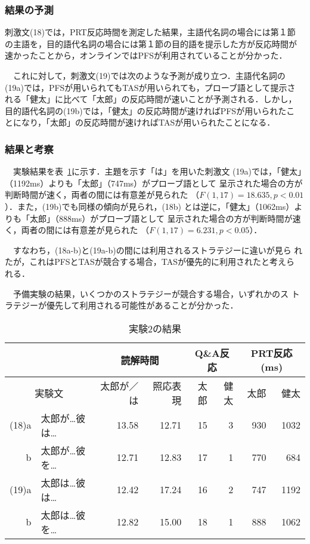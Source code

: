 \subsubsection{結果の予測}
刺激文(18)では，PRT反応時間を測定した結果，主語代名詞の場合には第１節
の主語を，目的語代名詞の場合には第１節の目的語を提示した方が反応時間が
速かったことから，オンラインではPFSが利用されていることが分かった．

　これに対して，刺激文(19)では次のような予測が成り立つ．主語代名詞の
(19a)では，PFSが用いられてもTASが用いられても，プローブ語として提示さ
れる「健太」に比べて「太郎」の反応時間が速いことが予測される．しかし，
目的語代名詞の(19b)では，「健太」の反応時間が速ければPFSが用いられたこ
とになり，「太郎」の反応時間が速ければTASが用いられたことになる．


\subsubsection{結果と考察}
　実験結果を表~\ref{table:exam2br}に示す．主題を示す「は」を用いた刺激文
(19a)では，「健太」（1192ms）よりも「太郎」（747ms）がプローブ語として
呈示された場合の方が判断時間が速く，両者の間には有意差が見られた
（$F(1,17)=18.635,p<0.01$）．また，(19b)でも同様の傾向が見られ，(18b)
とは逆に，「健太」（1062ms）よりも「太郎」（888ms）がプローブ語として
呈示された場合の方が判断時間が速く，両者の間には有意差が見られた
（$F(1,17)=6.231,p<0.05$）．

　すなわち，(18a-b)と(19a-b)の間には利用されるストラテジーに違いが見ら
れたが，これはPFSとTASが競合する場合，TASが優先的に利用されたと考えら
れる．

　予備実験の結果，いくつかのストラテジーが競合する場合，いずれかのス
トラテジーが優先して利用される可能性があることが分かった．

\begin{table}
\begin{center}
\caption{実験2の結果}
\label{table:exam2br}
\begin{tabular}{|rl|r|r|r|r|r|r|} \hline
 \multicolumn{2}{|c|}{}&
 \multicolumn{2}{c|}{読解時間} &
 \multicolumn{2}{c|}{Q\&A反応} &
 \multicolumn{2}{c|}{PRT反応(ms)} \\ \hline
 \multicolumn{2}{|c|}{実験文} & 
  太郎が／は & 照応表現 & 太郎 & 健太 & 太郎 & 健太 \\ \hline
 (18)a&	太郎が\ldots 彼は\ldots & 13.58 &	12.71 & 15 & 3 & 930 & 1032\\
     b&	太郎が\ldots 彼を\ldots & 12.71 & 12.83 & 17 & 1 & 770 & 684 \\
 (19)a&	太郎は\ldots 彼は\ldots & 12.42 & 17.24 & 16 & 2	& 747 & 1192\\
     b&	太郎は\ldots 彼を\ldots & 12.82 & 15.00 & 18 & 1	& 888 & 1062\\  \hline
\end{tabular}
\end{center}
\end{table}

